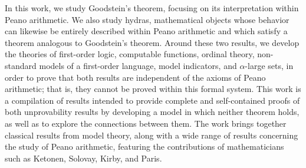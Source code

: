 In this work, we study Goodstein's theorem, focusing on its interpretation within Peano arithmetic. We also study hydras, mathematical objects whose behavior can likewise be entirely described within Peano arithmetic and which satisfy a theorem analogous to Goodstein's theorem.
Around these two results, we develop the theories of first-order logic, computable functions, ordinal theory, non-standard models of a first-order language, model indicators, and $\alpha$-large sets, in order to prove that both results are independent of the axioms of Peano arithmetic; that is, they cannot be proved within this formal system.
This work is a compilation of results intended to provide complete and self-contained proofs of both unprovability results by developing a model in which neither theorem holds, as well as to explore the connections between them.
The work brings together classical results from model theory, along with a wide range of results concerning the study of Peano arithmetic, featuring the contributions of mathematicians such as Ketonen, Solovay, Kirby, and Paris.